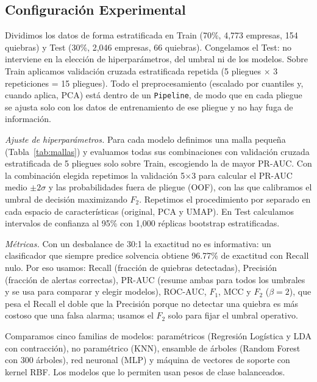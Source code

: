 \documentclass[journal]{IEEEtran}
\begin{document}
\subsection{Configuración Experimental}
Dividimos los datos de forma estratificada en Train (70\%, 4,773 empresas, 154 quiebras) y Test (30\%, 2,046 empresas, 66 quiebras). Congelamos el Test: no interviene en la elección de hiperparámetros, del umbral ni de los modelos. Sobre Train aplicamos validación cruzada estratificada repetida (5 pliegues $\times$ 3 repeticiones = 15 pliegues). Todo el preprocesamiento (escalado por cuantiles y, cuando aplica, PCA) está dentro de un \texttt{Pipeline}, de modo que en cada pliegue se ajusta solo con los datos de entrenamiento de ese pliegue y no hay fuga de información.

\textit{Ajuste de hiperparámetros.} Para cada modelo definimos una malla pequeña (Tabla~\ref{tab:mallas}) y evaluamos todas sus combinaciones con validación cruzada estratificada de 5 pliegues solo sobre Train, escogiendo la de mayor PR-AUC. Con la combinación elegida repetimos la validación 5$\times$3 para calcular el PR-AUC medio $\pm 2\sigma$ y las probabilidades fuera de pliegue (OOF), con las que calibramos el umbral de decisión maximizando $F_2$. Repetimos el procedimiento por separado en cada espacio de características (original, PCA y UMAP). En Test calculamos intervalos de confianza al 95\% con 1,000 réplicas bootstrap estratificadas.

\textit{Métricas.} Con un desbalance de 30:1 la exactitud no es informativa: un clasificador que siempre predice solvencia obtiene 96.77\% de exactitud con Recall nulo. Por eso usamos: Recall (fracción de quiebras detectadas), Precisión (fracción de alertas correctas), PR-AUC (resume ambas para todos los umbrales y se usa para comparar y elegir modelos), ROC-AUC, $F_1$, MCC y $F_2$ ($\beta=2$), que pesa el Recall el doble que la Precisión porque no detectar una quiebra es más costoso que una falsa alarma; usamos el $F_2$ solo para fijar el umbral operativo.

Comparamos cinco familias de modelos: paramétricos (Regresión Logística y LDA con contracción), no paramétrico (KNN), ensamble de árboles (Random Forest con 300 árboles), red neuronal (MLP) y máquina de vectores de soporte con kernel RBF. Los modelos que lo permiten usan pesos de clase balanceados.
\end{document}
